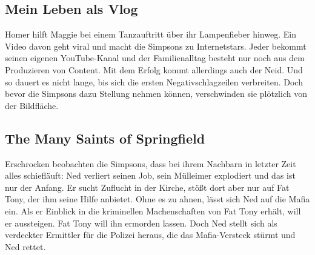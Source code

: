 \subsection{Mein Leben als Vlog}
Homer hilft Maggie bei einem Tanzauftritt über ihr Lampenfieber hinweg. Ein Video davon geht viral und macht die Simpsons zu Internetstars. Jeder bekommt seinen eigenen YouTube-Kanal und der Familienalltag besteht nur noch aus dem Produzieren von Content. Mit dem Erfolg kommt allerdings auch der Neid. Und so dauert es nicht lange, bis sich die ersten Negativschlagzeilen verbreiten. Doch bevor die Simpsons dazu Stellung nehmen können, verschwinden sie plötzlich von der Bildfläche.


\subsection{The Many Saints of Springfield}
Erschrocken beobachten die Simpsons, dass bei ihrem Nachbarn in letzter Zeit alles schiefläuft: Ned verliert seinen Job, sein Mülleimer explodiert und das ist nur der Anfang. Er sucht Zuflucht in der Kirche, stößt dort aber nur auf Fat Tony, der ihm seine Hilfe anbietet. Ohne es zu ahnen, lässt sich Ned auf die Mafia ein. Als er Einblick in die kriminellen Machenschaften von Fat Tony erhält, will er aussteigen. Fat Tony will ihn ermorden lassen. Doch Ned stellt sich als verdeckter Ermittler für die Polizei heraus, die das Mafia-Versteck stürmt und Ned rettet.



